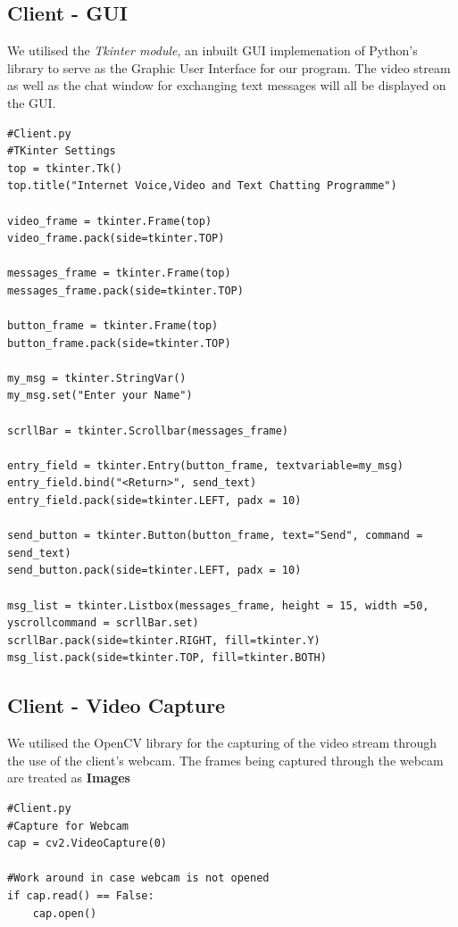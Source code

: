 \documentclass[a4paper,11pt]{article}
\begin{document}
\subsection{Client - GUI}
We utilised the \textit{Tkinter module}, an inbuilt GUI implemenation of Python's library to serve as the Graphic User Interface for our program. The video stream as well as the chat window for exchanging text messages will all be displayed on the GUI.
\begin{mdframed}[backgroundcolor=light-gray, roundcorner=30pt,leftmargin=1, rightmargin=1, innerleftmargin=5, innertopmargin=-3,innerbottommargin=5, outerlinewidth=1, linecolor=light-gray]
\begin{lstlisting}
#Client.py
#TKinter Settings
top = tkinter.Tk()
top.title("Internet Voice,Video and Text Chatting Programme")

video_frame = tkinter.Frame(top)
video_frame.pack(side=tkinter.TOP)

messages_frame = tkinter.Frame(top)
messages_frame.pack(side=tkinter.TOP)

button_frame = tkinter.Frame(top)
button_frame.pack(side=tkinter.TOP)

my_msg = tkinter.StringVar()
my_msg.set("Enter your Name")

scrllBar = tkinter.Scrollbar(messages_frame)

entry_field = tkinter.Entry(button_frame, textvariable=my_msg)
entry_field.bind("<Return>", send_text)
entry_field.pack(side=tkinter.LEFT, padx = 10)

send_button = tkinter.Button(button_frame, text="Send", command = send_text)
send_button.pack(side=tkinter.LEFT, padx = 10)

msg_list = tkinter.Listbox(messages_frame, height = 15, width =50, yscrollcommand = scrllBar.set)
scrllBar.pack(side=tkinter.RIGHT, fill=tkinter.Y)
msg_list.pack(side=tkinter.TOP, fill=tkinter.BOTH)
\end{lstlisting}
\end{mdframed}

\subsection{Client - Video Capture}
We utilised the OpenCV library for the capturing of the video stream through the use of the client's webcam. The frames being captured through the webcam are treated as \textbf{Images}
\begin{mdframed}[backgroundcolor=light-gray, roundcorner=30pt,leftmargin=1, rightmargin=1, innerleftmargin=5, innertopmargin=-3,innerbottommargin=5, outerlinewidth=1, linecolor=light-gray]
\begin{lstlisting}
#Client.py
#Capture for Webcam
cap = cv2.VideoCapture(0)

#Work around in case webcam is not opened
if cap.read() == False:
	cap.open()

\end{lstlisting}
\end{mdframed}
\end{document}
